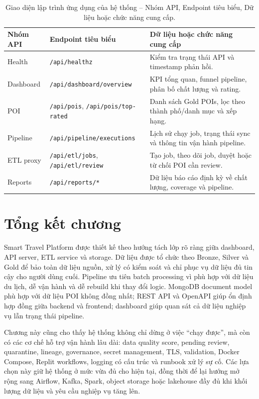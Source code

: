 \documentclass[12pt,a4paper]{article}
\begin{document}
\begin{longtable}{@{}p{}p{}p{}@{}}
\caption{Giao diện lập trình ứng dụng của hệ thống -- Nhóm API, Endpoint tiêu biểu, Dữ liệu hoặc chức năng cung cấp.}\\
\toprule
\textbf{Nhóm API} & \textbf{Endpoint tiêu biểu} & \textbf{Dữ liệu hoặc chức năng cung cấp} \\
\midrule
Health & \texttt{/api/healthz} & Kiểm tra trạng thái API và timestamp phản hồi. \\
Dashboard & \texttt{/api/dashboard/overview} & KPI tổng quan, funnel pipeline, phân bố chất lượng và rating. \\
POI & \texttt{/api/pois}, \texttt{/api/pois/top-rated} & Danh sách Gold POIs, lọc theo thành phố/danh mục và xếp hạng. \\
Pipeline & \texttt{/api/pipeline/executions} & Lịch sử chạy job, trạng thái sync và thông tin vận hành pipeline. \\
ETL proxy & \texttt{/api/etl/jobs}, \texttt{/api/etl/review} & Tạo job, theo dõi job, duyệt hoặc từ chối POI cần review. \\
Reports & \texttt{/api/reports/*} & Dữ liệu báo cáo định kỳ về chất lượng, coverage và pipeline. \\
\bottomrule
\end{longtable}

\section{Tổng kết chương}

Smart Travel Platform được thiết kế theo hướng tách lớp rõ ràng giữa dashboard, API server, ETL service và storage. Dữ liệu được tổ chức theo Bronze, Silver và Gold để bảo toàn dữ liệu nguồn, xử lý có kiểm soát và chỉ phục vụ dữ liệu đủ tin cậy cho người dùng cuối. Pipeline ưu tiên batch processing vì phù hợp với dữ liệu du lịch, dễ vận hành và dễ rebuild khi thay đổi logic. MongoDB document model phù hợp với dữ liệu POI không đồng nhất; REST API và OpenAPI giúp ổn định hợp đồng giữa backend và frontend; dashboard giúp quan sát cả dữ liệu nghiệp vụ lẫn trạng thái pipeline.

Chương này cũng cho thấy hệ thống không chỉ dừng ở việc ``chạy được'', mà còn có các cơ chế hỗ trợ vận hành lâu dài: data quality score, pending review, quarantine, lineage, governance, secret management, TLS, validation, Docker Compose, Replit workflows, logging có cấu trúc và runbook xử lý sự cố. Các lựa chọn này giữ hệ thống ở mức vừa đủ cho hiện tại, đồng thời để lại hướng mở rộng sang Airflow, Kafka, Spark, object storage hoặc lakehouse đầy đủ khi khối lượng dữ liệu và yêu cầu nghiệp vụ tăng lên.
\end{document}
